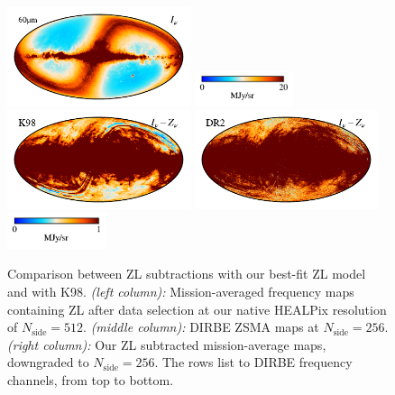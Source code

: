 \documentclass[twocolumn]{aa}
\begin{document}
\begin{figure}
    \includegraphics[height=2.90cm]{figs/compare_zsma/cosmoglobe_ma_07.pdf}%
    \includegraphics[width=2.90cm,angle=90]{figs/compare_zsma/cbar_tot_07.pdf}%
    \includegraphics[height=2.90cm]{figs/compare_zsma/dirbe_zsma_07.pdf}%
    \includegraphics[height=2.90cm]{figs/compare_zsma/cosmoglobe_zsma_07.pdf}%
    \includegraphics[width=2.90cm,angle=90]{figs/compare_zsma/cbar_07.pdf}%
      \\
    \caption{Comparison between ZL subtractions with our best-fit ZL model and with K98. 
    \textit{(left column):} Mission-averaged frequency maps containing ZL after data selection at our native HEALPix resolution 
    of $N_\mathrm{side} = 512$. \textit{(middle column):} DIRBE ZSMA maps
    at $N_\mathrm{side} = 256$.\textit{(right column):} Our ZL subtracted mission-average 
    maps, downgraded to $N_\mathrm{side} = 256$. The rows list to DIRBE frequency channels, from top to 
    bottom. 
    }
    \label{fig:dr2-zsma-compare1}
\end{figure}
\end{document}
